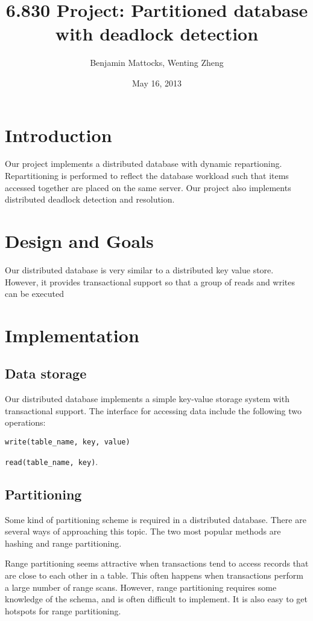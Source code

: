 \documentclass[a4paper, 10pt, notitlepage]{report}
\title{6.830 Project: Partitioned database with deadlock detection}
\author{Benjamin Mattocks, Wenting Zheng}
\date{May 16, 2013} %
\begin{document}
\maketitle
\thispagestyle{empty}
\newpage


\section*{Introduction}
Our project implements a distributed database with dynamic repartioning. Repartitioning is performed to reflect the database workload such that items accessed together are placed on the same server. Our project also implements distributed deadlock detection and resolution.

\section*{Design and Goals}

Our distributed database is very similar to a distributed key value store. However, it provides transactional support so that
a group of reads and writes can be executed 

\section*{Implementation}

\subsection*{Data storage}
Our distributed database implements a simple key-value storage system with transactional support. 
The interface for accessing data include the following two operations:

\texttt{write(table\_name, key, value)}

\texttt{read(table\_name, key)}.


\subsection*{Partitioning}
Some kind of partitioning scheme is required in a distributed database. There are several ways of approaching
this topic. The two most popular methods are hashing and range partitioning.

Range partitioning seems attractive when transactions tend to access records that are close to each other
in a table. This often happens when transactions perform a large number of range scans. However, range partitioning
requires some knowledge of the schema, and is often difficult to implement. It is also easy to get hotspots for
range partitioning.
\end{document}
